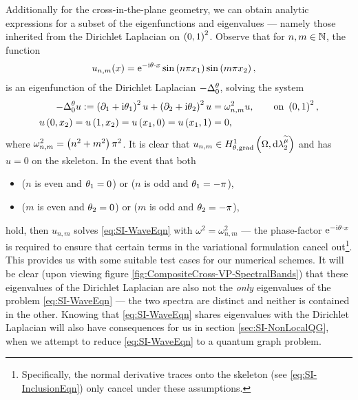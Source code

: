 Additionally for the cross-in-the-plane geometry, we can obtain analytic expressions for a subset of the eigenfunctions and eigenvalues --- namely those inherited from the Dirichlet Laplacian on $\left( 0,1 \right)^2$.
Observe that for $n,m\in\mathbb{N}$, the function
\begin{align*}
	u_{n,m}(x) &= \mathrm{e}^{-\mathrm{i}\theta\cdot x}\sin\left( n\pi x_1 \right)\sin\left( m\pi x_2 \right),
\end{align*}
is an eigenfunction of the Dirichlet Laplacian $-\Delta^{\theta}_0$, solving the system
\begin{align*}
	-\Delta^{\theta}_0 u 
	:= \left( \partial_1+\mathrm{i}\theta_1 \right)^2 u + \left( \partial_2+\mathrm{i}\theta_2 \right)^2 u
	&= \omega_{n,m}^2 u, \qquad \text{on } \left( 0,1 \right)^2, \\
	u\left( 0,x_2 \right) = u\left( 1,x_2 \right) = u\left( x_1,0 \right) = u\left( x_1,1 \right) &= 0,
\end{align*}
where $\omega_{n,m}^2 = \left( n^2+m^2 \right)\pi^2$.
It is clear that $u_{n,m}\in H^1_{\theta, \mathrm{grad}}\left( \Omega, \mathrm{d}\lambda_2^{\widetilde{\mu}} \right)$ and has $u=0$ on the skeleton.
In the event that both
\begin{itemize}
	\item ($n$ is even and $\theta_1=0$) or ($n$ is odd and $\theta_1=-\pi$),
	\item ($m$ is even and $\theta_2=0$) or ($m$ is odd and $\theta_2=-\pi$),
\end{itemize}
hold, then $u_{n,m}$ solves \eqref{eq:SI-WaveEqn} with $\omega^2 = \omega_{n,m}^2$ --- the phase-factor $\mathrm{e}^{-\mathrm{i}\theta\cdot x}$ is required to ensure that certain terms in the variational formulation cancel out\footnote{Specifically, the normal derivative traces onto the skeleton (see \eqref{eq:SI-InclusionEqn}) only cancel under these assumptions.}.
This provides us with some suitable test cases for our numerical schemes.
It will be clear (upon viewing figure \ref{fig:CompositeCross-VP-SpectralBands}) that these eigenvalues of the Dirichlet Laplacian are also not the \emph{only} eigenvalues of the problem \eqref{eq:SI-WaveEqn} --- the two spectra are distinct and neither is contained in the other.
Knowing that \eqref{eq:SI-WaveEqn} shares eigenvalues with the Dirichlet Laplacian will also have consequences for us in section \ref{sec:SI-NonLocalQG}, when we attempt to reduce \eqref{eq:SI-WaveEqn} to a quantum graph problem.
